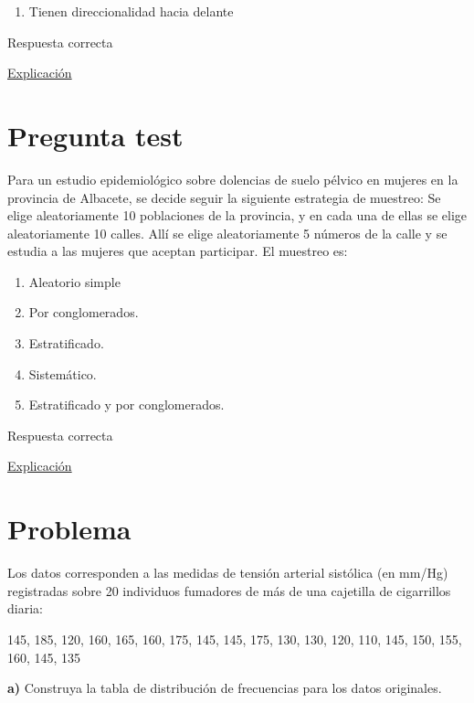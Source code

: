 \documentclass[
]{book}
\providecommand{\tightlist}{%
  \setlength{\itemsep}{0pt}\setlength{\parskip}{0pt}}
\begin{document}
\begin{enumerate}
\def\labelenumi{\arabic{enumi})}
\setcounter{enumi}{4}
\tightlist
\item
  Tienen direccionalidad hacia delante
\end{enumerate}

Respuesta correcta

\href{https://es.wikipedia.org/wiki/Estudio_de_cohorte}{Explicación}

\hypertarget{pregunta-test-24}{%
\section{Pregunta test}\label{pregunta-test-24}}

Para un estudio epidemiológico sobre dolencias de suelo pélvico en mujeres en la provincia de Albacete, se decide seguir la siguiente estrategia de muestreo: Se elige aleatoriamente 10 poblaciones de la provincia, y en cada una de ellas se elige aleatoriamente 10 calles. Allí se elige aleatoriamente 5 números de la calle y se estudia a las mujeres que aceptan participar. El muestreo es:

\begin{enumerate}
\def\labelenumi{\alph{enumi})}
\tightlist
\item
  Aleatorio simple
\item
  Por conglomerados.
\item
  Estratificado.
\item
  Sistemático.
\item
  Estratificado y por conglomerados.
\end{enumerate}

Respuesta correcta

\href{https://1fjmanzano.github.io/bioestadistica/me\%CC\%81todos-de-muestreo.html}{Explicación}

\hypertarget{problema-4}{%
\section{Problema}\label{problema-4}}

Los datos corresponden a las medidas de tensión arterial sistólica (en mm/Hg) registradas sobre 20 individuos fumadores de más de una cajetilla de cigarrillos diaria:

145, 185, 120, 160, 165, 160, 175, 145, 145, 175, 130, 130, 120, 110, 145, 150, 155, 160, 145, 135

\textbf{a)} Construya la tabla de distribución de frecuencias para los datos originales.
\end{document}
